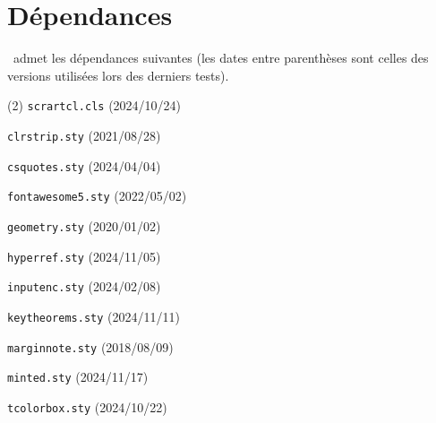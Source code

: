 \section{Dépendances}

\thisproj\ admet les dépendances suivantes (les dates entre parenthèses sont celles des versions utilisées lors des derniers tests).
%
\begin{tasks}[style=itemize](2)
    \task \texttt{scrartcl.cls}
    \hfill {\small (2024/10/24)}\kern10pt

    \task \texttt{clrstrip.sty}
    \hfill {\small (2021/08/28)}\kern10pt

    \task \texttt{csquotes.sty}
    \hfill {\small (2024/04/04)}\kern10pt

    \task \texttt{fontawesome5.sty}
    \hfill {\small (2022/05/02)}\kern10pt

    \task \texttt{geometry.sty}
    \hfill {\small (2020/01/02)}\kern10pt

    \task \texttt{hyperref.sty}
    \hfill {\small (2024/11/05)}\kern10pt

    \task \texttt{inputenc.sty}
    \hfill {\small (2024/02/08)}\kern10pt

    \task \texttt{keytheorems.sty}
    \hfill {\small (2024/11/11)}\kern10pt

    \task \texttt{marginnote.sty}
    \hfill {\small (2018/08/09)}\kern10pt

    \task \texttt{minted.sty}
    \hfill {\small (2024/11/17)}\kern10pt

    \task \texttt{tcolorbox.sty}
    \hfill {\small (2024/10/22)}\kern10pt
\end{tasks}
